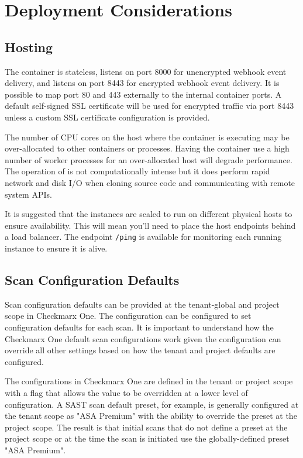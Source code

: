 \section{Deployment Considerations}

\subsection{Hosting}

The \cxoneflow container is stateless, listens on port 8000 for unencrypted webhook event delivery, 
and listens on port 8443 for encrypted webhook event delivery.  It is possible to map port 80 and 443
externally to the internal container ports.  A default self-signed SSL certificate will be used
for encrypted traffic via port 8443 unless a custom SSL certificate configuration is provided.  

The number of CPU cores on the host where the container is executing may be over-allocated to other
containers or processes.  Having the container use a high number of worker processes for an over-allocated
host will degrade performance.  The operation of \cxoneflow is not computationally intense
but it does perform rapid network and disk I/O when cloning source code and communicating with
remote system APIs.

It is suggested that the \cxoneflow instances are scaled to run on different physical hosts to
ensure availability.  This will mean you'll need to place the \cxoneflow host endpoints behind 
a load balancer.  The \cxoneflow endpoint \texttt{/ping} is available for monitoring each
running instance to ensure it is alive.

\subsection{Scan Configuration Defaults}\label{sec:deployment-scan-defaults}

Scan configuration defaults can be provided at the tenant-global and project scope
in Checkmarx One.  The \cxoneflow configuration can be configured to set configuration
defaults for each scan.  It is important to understand how the Checkmarx One default
scan configurations work given the \cxoneflow configuration can override all other
settings based on how the tenant and project defaults are configured.

The configurations in Checkmarx One are defined in the tenant or project scope with a
flag that allows the value to be overridden at a lower level of configuration.  A
SAST scan default preset, for example, is generally configured at the tenant scope
as "ASA Premium" with the ability to override the preset at the project scope.  The
result is that initial scans that do not define a preset at the project scope or
at the time the scan is initiated use the globally-defined preset "ASA Premium".

